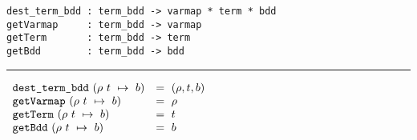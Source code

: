 \documentclass[12pt]{article}
\newlength{\minipagewidth}
\renewcommand{\t}[1]{\mbox{\tt #1}}
\newcommand{\termbdd}[3]{\mbox{$#1~#2~\mapsto~#3$}}
\begin{document}
\newsavebox\destructors
\begin{lrbox}\destructors
\begin{minipage}{\minipagewidth}

\begin{footnotesize}
\begin{verbatim}
dest_term_bdd : term_bdd -> varmap * term * bdd
getVarmap     : term_bdd -> varmap
getTerm       : term_bdd -> term
getBdd        : term_bdd -> bdd
\end{verbatim}
\end{footnotesize}
\vspace*{-6mm}

\noindent \rule\minipagewidth{0.1pt}

\vspace*{1mm}

\begin{footnotesize}
\hspace*{-1.5mm}$\begin{array}{ll}
\t{dest\_term\_bdd}~(\termbdd{\rho}{t}{b})&=~(\rho, t, b)\\
\t{getVarmap}~(\termbdd{\rho}{t}{b})&=~\rho\\
\t{getTerm}~(\termbdd{\rho}{t}{b})&=~t\\
\t{getBdd}~(\termbdd{\rho}{t}{b})&=~b
\end{array}$
\end{footnotesize}
\end{minipage}
\end{lrbox}
\fbox{\usebox{\destructors}}

\bigskip

\newsavebox\inSupport
{}
\fbox{\usebox{\inSupport}}

\bigskip
\end{document}
